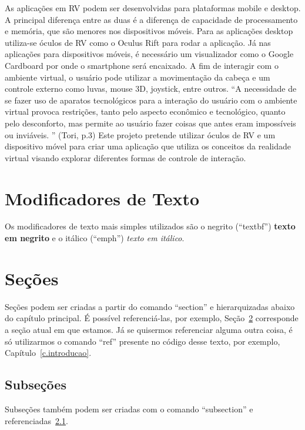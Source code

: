 As aplicações em RV podem ser desenvolvidas para plataformas mobile e desktop. A principal diferença entre as duas é a diferença de capacidade de processamento e memória, que são menores nos dispositivos móveis. Para as aplicações desktop utiliza-se óculos de RV como o Oculus Rift para rodar a aplicação. Já nas aplicações para dispositivos móveis, é necessário um visualizador como o Google Cardboard por onde o smartphone será encaixado.
A fim de interagir com o ambiente virtual, o usuário pode utilizar a movimentação da cabeça e um controle externo como luvas, mouse 3D, joystick, entre outros. “A necessidade de se fazer uso de aparatos tecnológicos para a interação do usuário com o ambiente virtual provoca restrições, tanto pelo aspecto econômico e tecnológico, quanto pelo desconforto, mas permite ao usuário fazer coisas que antes eram impossíveis ou inviáveis. ” (Tori, p.3)
Este projeto pretende utilizar óculos de RV e um dispositivo móvel para criar uma aplicação que utiliza os conceitos da realidade virtual visando explorar diferentes formas de controle de interação.

\section{Modificadores de Texto}
\label{s.modificador}

Os modificadores de texto mais simples utilizados são o negrito (``textbf'') \textbf{texto em negrito} e o itálico (``emph'') \emph{texto em itálico}.

\section{Seções}
\label{s.citacoes}

Seções podem ser criadas a partir do comando ``section'' e hierarquizadas abaixo do capítulo principal. É possível referenciá-las, por exemplo, Seção~\ref{s.citacoes} corresponde a seção atual em que estamos. Já se quisermos referenciar alguma outra coisa, é só utilizarmos o comando ``ref'' presente no código desse texto, por exemplo, Capítulo~\ref{c.introducao}.

\subsection{Subseções}
\label{ss.subsecao}

Subseções também podem ser criadas com o comando ``subsection'' e referenciadas~\ref{ss.subsecao}.


